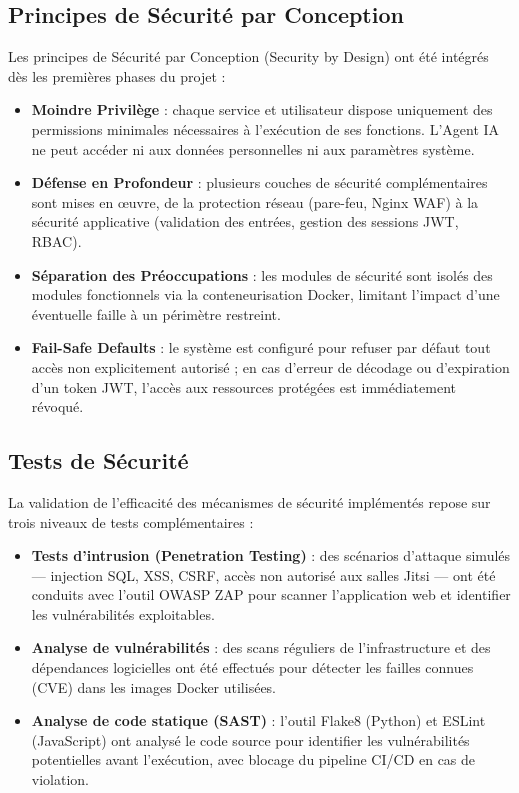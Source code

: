 \subsection{Principes de Sécurité par Conception}
Les principes de Sécurité par Conception (Security by Design) ont été intégrés dès les premières phases du projet \cite{nist} :
\begin{itemize}
    \item \textbf{Moindre Privilège} : chaque service et utilisateur dispose uniquement des permissions minimales nécessaires à l'exécution de ses fonctions. L'Agent IA ne peut accéder ni aux données personnelles ni aux paramètres système.
    \item \textbf{Défense en Profondeur} : plusieurs couches de sécurité complémentaires sont mises en \oe{}uvre, de la protection réseau (pare-feu, Nginx WAF) à la sécurité applicative (validation des entrées, gestion des sessions JWT, RBAC).
    \item \textbf{Séparation des Préoccupations} : les modules de sécurité sont isolés des modules fonctionnels via la conteneurisation Docker, limitant l'impact d'une éventuelle faille à un périmètre restreint.
    \item \textbf{Fail-Safe Defaults} : le système est configuré pour refuser par défaut tout accès non explicitement autorisé ; en cas d'erreur de décodage ou d'expiration d'un token JWT, l'accès aux ressources protégées est immédiatement révoqué.
\end{itemize}

\subsection{Tests de Sécurité}
La validation de l'efficacité des mécanismes de sécurité implémentés repose sur trois niveaux de tests complémentaires :
\begin{itemize}
    \item \textbf{Tests d'intrusion (Penetration Testing)} : des scénarios d'attaque simulés — injection SQL, XSS, CSRF, accès non autorisé aux salles Jitsi — ont été conduits avec l'outil OWASP ZAP pour scanner l'application web et identifier les vulnérabilités exploitables.
    \item \textbf{Analyse de vulnérabilités} : des scans réguliers de l'infrastructure et des dépendances logicielles ont été effectués pour détecter les failles connues (CVE) dans les images Docker utilisées.
    \item \textbf{Analyse de code statique (SAST)} : l'outil Flake8 (Python) et ESLint (JavaScript) ont analysé le code source pour identifier les vulnérabilités potentielles avant l'exécution, avec blocage du pipeline CI/CD en cas de violation.
\end{itemize}

